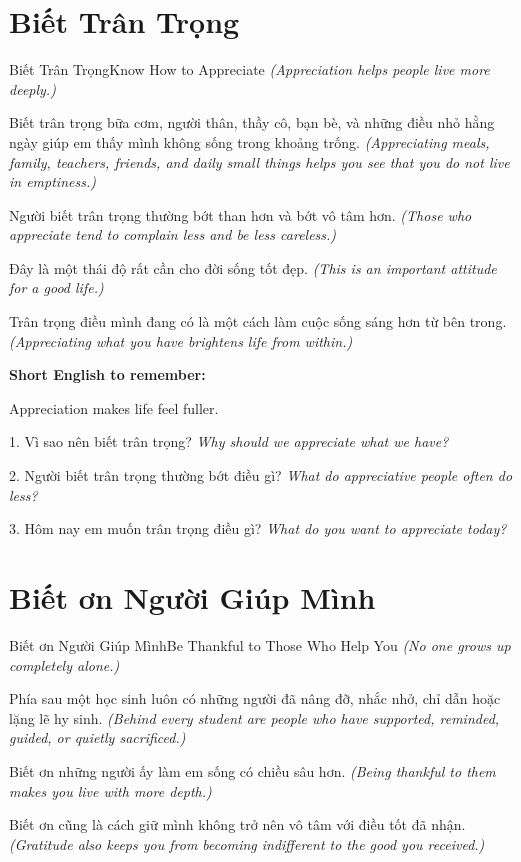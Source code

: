 \section{Biết Trân Trọng}
\begin{truyen}{Biết Trân Trọng}{Know How to Appreciate}
\textit{(Appreciation helps people live more deeply.)}

Biết trân trọng bữa cơm, người thân, thầy cô, bạn bè, và những điều nhỏ hằng ngày giúp em thấy mình không sống trong khoảng trống.
\textit{(Appreciating meals, family, teachers, friends, and daily small things helps you see that you do not live in emptiness.)}

Người biết trân trọng thường bớt than hơn và bớt vô tâm hơn.
\textit{(Those who appreciate tend to complain less and be less careless.)}

Đây là một thái độ rất cần cho đời sống tốt đẹp.
\textit{(This is an important attitude for a good life.)}
\end{truyen}

\begin{baihoc}
Trân trọng điều mình đang có là một cách làm cuộc sống sáng hơn từ bên trong.
\textit{(Appreciating what you have brightens life from within.)}
\end{baihoc}

\begin{ghinhoanh}
\textbf{Short English to remember:}

Appreciation makes life feel fuller.

\end{ghinhoanh}

\begin{tuhocnhanh}
1. Vì sao nên biết trân trọng? \textit{Why should we appreciate what we have?}

2. Người biết trân trọng thường bớt điều gì? \textit{What do appreciative people often do less?}

3. Hôm nay em muốn trân trọng điều gì? \textit{What do you want to appreciate today?}
\end{tuhocnhanh}
\ngancach

\section{Biết ơn Người Giúp Mình}
\begin{truyen}{Biết ơn Người Giúp Mình}{Be Thankful to Those Who Help You}
\textit{(No one grows up completely alone.)}

Phía sau một học sinh luôn có những người đã nâng đỡ, nhắc nhở, chỉ dẫn hoặc lặng lẽ hy sinh.
\textit{(Behind every student are people who have supported, reminded, guided, or quietly sacrificed.)}

Biết ơn những người ấy làm em sống có chiều sâu hơn.
\textit{(Being thankful to them makes you live with more depth.)}

Biết ơn cũng là cách giữ mình không trở nên vô tâm với điều tốt đã nhận.
\textit{(Gratitude also keeps you from becoming indifferent to the good you received.)}
\end{truyen}

